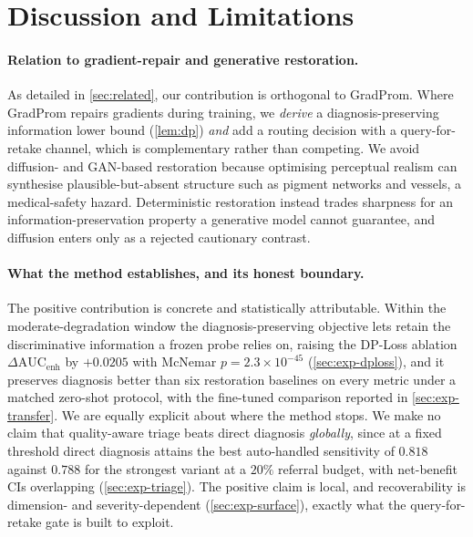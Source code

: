 
\section{Discussion and Limitations}\label{sec:discussion}

\paragraph{Relation to gradient-repair and generative restoration.}
As detailed in \cref{sec:related}, our contribution is orthogonal to GradProm. Where
GradProm repairs gradients during training, we \emph{derive} a diagnosis-preserving
information lower bound (\cref{lem:dp}) \emph{and} add a routing decision with a
query-for-retake channel, which is complementary rather than competing. We avoid diffusion-
and GAN-based restoration because optimising perceptual realism can synthesise
plausible-but-absent structure such as pigment networks and vessels, a medical-safety
hazard. Deterministic restoration instead trades sharpness for an information-preservation
property a generative model cannot guarantee, and diffusion enters only as a rejected
cautionary contrast.

\paragraph{What the method establishes, and its honest boundary.}
The positive contribution is concrete and statistically attributable. Within the
moderate-degradation window the diagnosis-preserving objective lets \visienhance retain the
discriminative information a frozen probe relies on, raising the DP-Loss ablation
$\Delta\mathrm{AUC}_{\text{enh}}$ by $+0.0205$ with McNemar $p=2.3\times10^{-45}$
(\cref{sec:exp-dploss}), and it preserves diagnosis better than six restoration baselines on
every metric under a matched zero-shot protocol, with the fine-tuned comparison reported in
\cref{sec:exp-transfer}. We are equally explicit about where the method stops. We make no
claim that quality-aware triage beats direct diagnosis \emph{globally}, since at a fixed
threshold direct diagnosis attains the best auto-handled sensitivity of $0.818$ against
$0.788$ for the strongest variant at a $20\%$ referral budget, with net-benefit CIs
overlapping (\cref{sec:exp-triage}). The positive claim is local, and recoverability is
dimension- and severity-dependent (\cref{sec:exp-surface}), exactly what the
query-for-retake gate is built to exploit.

